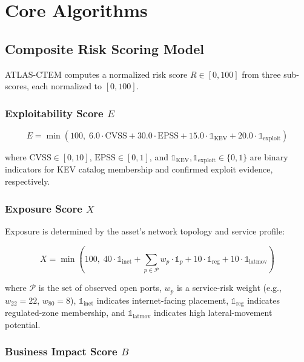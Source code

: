 \documentclass[conference]{IEEEtran}
\begin{document}
\section{Core Algorithms}

\subsection{Composite Risk Scoring Model}

ATLAS-CTEM computes a normalized risk score $R \in [0, 100]$ from three sub-scores, each normalized to $[0, 100]$.

\subsubsection{Exploitability Score $E$}

\begin{equation}
  E = \min\!\left(100,\; 6.0 \cdot \text{CVSS} + 30.0 \cdot \text{EPSS} + 15.0 \cdot \mathbb{1}_{\text{KEV}} + 20.0 \cdot \mathbb{1}_{\text{exploit}}\right)
\end{equation}

where $\text{CVSS} \in [0, 10]$, $\text{EPSS} \in [0, 1]$, and $\mathbb{1}_{\text{KEV}}, \mathbb{1}_{\text{exploit}} \in \{0,1\}$ are binary indicators for KEV catalog membership and confirmed exploit evidence, respectively.

\subsubsection{Exposure Score $X$}

Exposure is determined by the asset's network topology and service profile:

\begin{equation}
  X = \min\!\left(100,\; 40 \cdot \mathbb{1}_{\text{inet}} + \sum_{p \in \mathcal{P}} w_p \cdot \mathbb{1}_{p} + 10 \cdot \mathbb{1}_{\text{reg}} + 10 \cdot \mathbb{1}_{\text{latmov}}\right)
\end{equation}

where $\mathcal{P}$ is the set of observed open ports, $w_p$ is a service-risk weight (e.g., $w_{22} = 22$, $w_{80} = 8$), $\mathbb{1}_{\text{inet}}$ indicates internet-facing placement, $\mathbb{1}_{\text{reg}}$ indicates regulated-zone membership, and $\mathbb{1}_{\text{latmov}}$ indicates high lateral-movement potential.

\subsubsection{Business Impact Score $B$}
\end{document}
